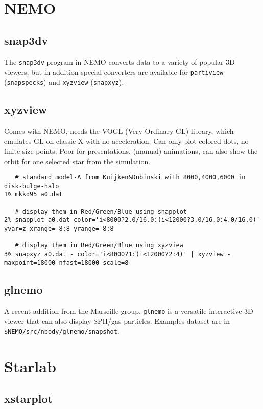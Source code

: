 \begin{itemize}
\begin{itemize}
\section{NEMO}


\subsection{snap3dv}

The {\tt snap3dv} program in NEMO converts data to a variety of popular
3D viewers, but in addition special converters are available 
for {\tt partiview} ({\tt snapspecks}) and {\tt xyzview} ({\tt snapxyz}).

\subsection{xyzview}

Comes with NEMO, needs the VOGL (Very Ordinary GL) library, which emulates
GL on classic X with no acceleration. Can only plot colored dots, no finite
size points. Poor for presentations. (manual) animations, can also show
the orbit for one selected star from the simulation. 


\footnotesize\begin{verbatim}
   # standard model-A from Kuijken&Dubinski with 8000,4000,6000 in disk-bulge-halo
1% mkkd95 a0.dat

   # display them in Red/Green/Blue using snapplot 
2% snapplot a0.dat color='i<8000?2.0/16.0:(i<12000?3.0/16.0:4.0/16.0)' yvar=z xrange=-8:8 yrange=-8:8

   # display them in Red/Green/Blue using xyzview
3% snapxyz a0.dat - color='i<8000?1:(i<12000?2:4)' | xyzview - maxpoint=18000 nfast=18000 scale=8
\end{verbatim}\normalsize

\subsection{glnemo}

A recent addition from the Marseille group, {\tt glnemo} is a versatile 
interactive 3D viewer that can also display SPH/gas particles. Examples
dataset are in {\tt \$NEMO/src/nbody/glnemo/snapshot}.

\section{Starlab}
\subsection{xstarplot}


\end{itemize}
\end{itemize}
